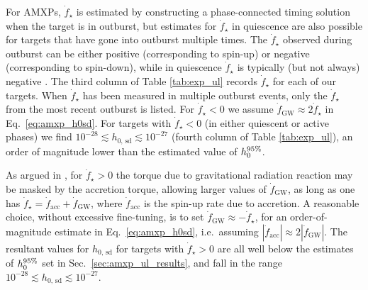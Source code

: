 For AMXPs, $\dot{f}_\star$ is estimated by constructing a phase-connected timing solution when the target is in outburst, but estimates for $\dot{f}_\star$ in quiescence are also possible for targets that have gone into outburst multiple times. The $\dot{f}_\star$ observed during outburst can be either positive (corresponding to spin-up) or negative (corresponding to spin-down), while in quiescence $\dot{f}_\star$ is typically (but not always) negative \cite{Ghosh1977, Melatos2016}. The third column of Table \ref{tab:exp_ul} records $\dot{f}_\star$ for each of our targets. When $\dot{f}_\star$ has been measured in multiple outburst events, only the $\dot{f}_\star$ from the most recent outburst is listed. For $\dot{f}_\star < 0$ we assume $\dot{f}_\textrm{GW} \approx 2 \dot{f}_\star$ in Eq.~\eqref{eq:amxp_h0sd}. For targets with $\dot{f}_\star < 0$ (in either quiescent or active phases) we find $10^{-28} \lesssim h_{0,\,\textrm{sd}} \lesssim 10^{-27}$ (fourth column of Table \ref{tab:exp_ul}), an order of magnitude lower than the estimated value of $h_0^{95\%}$. 

As argued in \citet{Middleton2020}, for $\dot{f}_\star > 0$ the torque due to gravitational radiation reaction may be masked by the accretion torque, allowing larger values of $\dot{f}_\textrm{GW}$, as long as one has $\dot{f}_\star = \dot{f}_\textrm{acc} + \dot{f}_\textrm{GW}$, where $\dot{f}_\textrm{acc}$ is the spin-up rate due to accretion. A reasonable choice, without excessive fine-tuning, is to set $\dot{f}_\textrm{GW} \approx - \dot{f}_\star$, for an order-of-magnitude estimate in Eq.~\eqref{eq:amxp_h0sd}, i.e.~assuming $|\dot{f}_\textrm{acc}| \approx 2 |\dot{f}_\textrm{GW}|$. The resultant values for $h_{0,\,\textrm{sd}}$ for targets with $\dot{f}_\star > 0$ are all well below the estimates of $h_0^{95\%}$ set in Sec.~\ref{sec:amxp_ul_results}, and fall in the range $10^{-28} \lesssim h_{0,\,\textrm{sd}} \lesssim 10^{-27}$. 

